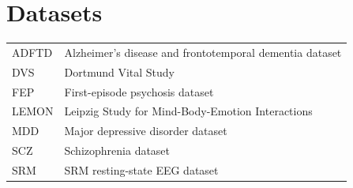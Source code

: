 \section*{Datasets}

\begin{longtable}{@{}p{}>{\raggedright\arraybackslash}p{}@{}}
  ADFTD & Alzheimer's disease and frontotemporal dementia dataset \\
  DVS   & Dortmund Vital Study \\
  FEP   & First-episode psychosis dataset \\
  LEMON & Leipzig Study for Mind-Body-Emotion Interactions \\
  MDD   & Major depressive disorder dataset \\
  SCZ   & Schizophrenia dataset \\
  SRM   & SRM resting-state EEG dataset \\
\end{longtable}
